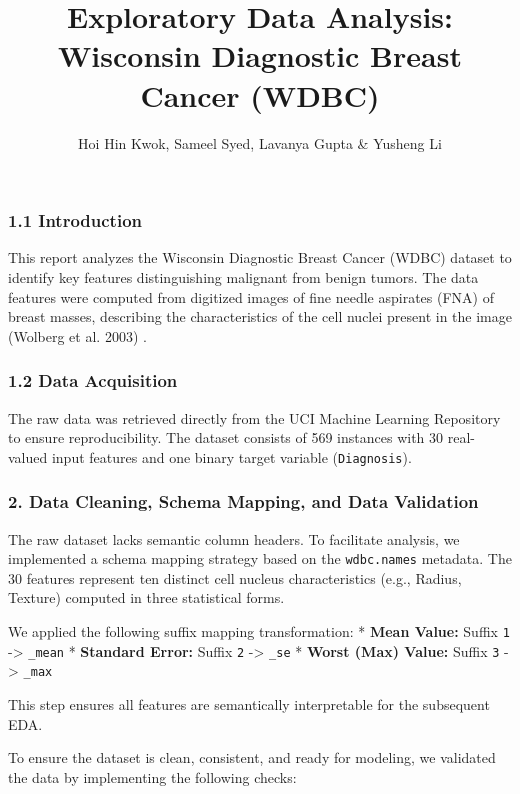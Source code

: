 \documentclass[
  letterpaper,
  DIV=11,
  numbers=noendperiod]{scrartcl}
\title{Exploratory Data Analysis: Wisconsin Diagnostic Breast Cancer
(WDBC)}
\author{Hoi Hin Kwok, Sameel Syed, Lavanya Gupta \& Yusheng Li}
\date{}
\begin{document}
\maketitle


\subsubsection{1.1 Introduction}\label{introduction}

This report analyzes the Wisconsin Diagnostic Breast Cancer (WDBC)
dataset to identify key features distinguishing malignant from benign
tumors. The data features were computed from digitized images of fine
needle aspirates (FNA) of breast masses, describing the characteristics
of the cell nuclei present in the image (Wolberg et al. 2003) .

\subsubsection{1.2 Data Acquisition}\label{data-acquisition}

The raw data was retrieved directly from the UCI Machine Learning
Repository to ensure reproducibility. The dataset consists of 569
instances with 30 real-valued input features and one binary target
variable (\texttt{Diagnosis}).

\subsubsection{2. Data Cleaning, Schema Mapping, and Data
Validation}\label{data-cleaning-schema-mapping-and-data-validation}

The raw dataset lacks semantic column headers. To facilitate analysis,
we implemented a schema mapping strategy based on the
\texttt{wdbc.names} metadata. The 30 features represent ten distinct
cell nucleus characteristics (e.g., Radius, Texture) computed in three
statistical forms.

We applied the following suffix mapping transformation: * \textbf{Mean
Value:} Suffix \texttt{1} -\textgreater{} \texttt{\_mean} *
\textbf{Standard Error:} Suffix \texttt{2} -\textgreater{} \texttt{\_se}
* \textbf{Worst (Max) Value:} Suffix \texttt{3} -\textgreater{}
\texttt{\_max}

This step ensures all features are semantically interpretable for the
subsequent EDA.

To ensure the dataset is clean, consistent, and ready for modeling, we
validated the data by implementing the following checks:
\end{document}
